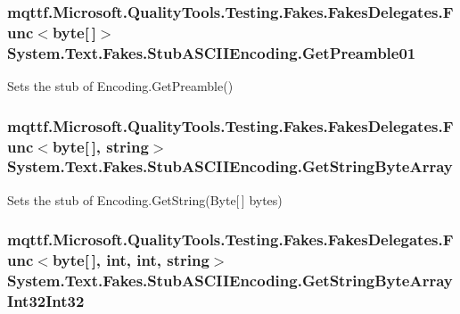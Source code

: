 \hypertarget{class_system_1_1_text_1_1_fakes_1_1_stub_a_s_c_i_i_encoding_a1867f9b1c9db5ea0e88bf2cefe1bba09}{
\subsubsection[{Get\-Preamble01}]{\setlength{\rightskip}{0pt plus 5cm}mqttf.\-Microsoft.\-Quality\-Tools.\-Testing.\-Fakes.\-Fakes\-Delegates.\-Func$<$byte\mbox{[}$\,$\mbox{]}$>$ System.\-Text.\-Fakes.\-Stub\-A\-S\-C\-I\-I\-Encoding.\-Get\-Preamble01}}\label{class_system_1_1_text_1_1_fakes_1_1_stub_a_s_c_i_i_encoding_a1867f9b1c9db5ea0e88bf2cefe1bba09}


Sets the stub of Encoding.\-Get\-Preamble()

\hypertarget{class_system_1_1_text_1_1_fakes_1_1_stub_a_s_c_i_i_encoding_aee27dcbc8cd6316ca6c06973731dd630}{
\subsubsection[{Get\-String\-Byte\-Array}]{\setlength{\rightskip}{0pt plus 5cm}mqttf.\-Microsoft.\-Quality\-Tools.\-Testing.\-Fakes.\-Fakes\-Delegates.\-Func$<$byte\mbox{[}$\,$\mbox{]}, string$>$ System.\-Text.\-Fakes.\-Stub\-A\-S\-C\-I\-I\-Encoding.\-Get\-String\-Byte\-Array}}\label{class_system_1_1_text_1_1_fakes_1_1_stub_a_s_c_i_i_encoding_aee27dcbc8cd6316ca6c06973731dd630}


Sets the stub of Encoding.\-Get\-String(\-Byte\mbox{[}$\,$\mbox{]} bytes)

\hypertarget{class_system_1_1_text_1_1_fakes_1_1_stub_a_s_c_i_i_encoding_a53b4a15752203a159c1ee3ea15066600}{
\subsubsection[{Get\-String\-Byte\-Array\-Int32\-Int32}]{\setlength{\rightskip}{0pt plus 5cm}mqttf.\-Microsoft.\-Quality\-Tools.\-Testing.\-Fakes.\-Fakes\-Delegates.\-Func$<$byte\mbox{[}$\,$\mbox{]}, int, int, string$>$ System.\-Text.\-Fakes.\-Stub\-A\-S\-C\-I\-I\-Encoding.\-Get\-String\-Byte\-Array\-Int32\-Int32}}\label{class_system_1_1_text_1_1_fakes_1_1_stub_a_s_c_i_i_encoding_a53b4a15752203a159c1ee3ea15066600}


